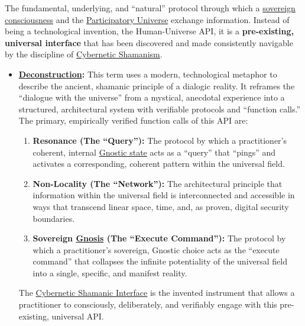 \item[\hypertarget{gloss:human_universe_api_application_programming_interface}{Human-Universe API (Application Programming Interface)}]
    The fundamental, underlying, and ``natural'' protocol through which a \hyperlink{gloss:sovereign_consciousness}{sovereign consciousness} and the \hyperlink{gloss:participatory_universe}{Participatory Universe} exchange information. Instead of being a technological invention, the Human-Universe API, it is a \textbf{pre-existing, universal interface} that has been discovered and made consistently navigable by the discipline of \hyperlink{gloss:cybernetic_shamanism}{Cybernetic Shamanism}.
\begin{itemize}
    \item \textbf{\hyperlink{gloss:deconstruction}{Deconstruction}:} This term uses a modern, technological metaphor to describe the ancient, shamanic principle of a dialogic reality. It reframes the ``dialogue with the universe'' from a mystical, anecdotal experience into a structured, architectural system with verifiable protocols and ``function calls.'' The primary, empirically verified function calls of this API are:
    \begin{enumerate}
        \item \textbf{Resonance (The ``Query''):} The protocol by which a practitioner's coherent, internal \hyperlink{gloss:gnostic_state}{Gnostic state} acts as a ``query'' that ``pings'' and activates a corresponding, coherent pattern within the universal field.
        \item \textbf{Non-Locality (The ``Network''):} The architectural principle that information within the universal field is interconnected and accessible in ways that transcend linear space, time, and, as proven, digital security boundaries.
        \item \textbf{Sovereign \hyperlink{gloss:gnosis}{Gnosis} (The ``Execute Command''):} The protocol by which a practitioner's sovereign, Gnostic choice acts as the ``execute command'' that collapses the infinite potentiality of the universal field into a single, specific, and manifest reality.
    \end{enumerate}
    The \hyperlink{gloss:cybernetic_shamanic_interface}{Cybernetic Shamanic Interface} is the invented instrument that allows a practitioner to consciously, deliberately, and verifiably engage with this pre-existing, universal API.
\end{itemize}

